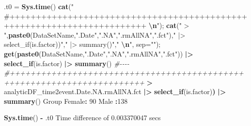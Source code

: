\documentclass[
]{article}
\newenvironment{Shaded}{\begin{snugshade}}{\end{snugshade}}
\newcommand{\AttributeTok}[1]{\textcolor[rgb]{0.13,0.29,0.53}{#1}}
\newcommand{\CommentTok}[1]{\textcolor[rgb]{0.56,0.35,0.01}{\textit{#1}}}
\newcommand{\DecValTok}[1]{\textcolor[rgb]{0.00,0.00,0.81}{#1}}
\newcommand{\ErrorTok}[1]{\textcolor[rgb]{0.64,0.00,0.00}{\textbf{#1}}}
\newcommand{\FloatTok}[1]{\textcolor[rgb]{0.00,0.00,0.81}{#1}}
\newcommand{\FunctionTok}[1]{\textcolor[rgb]{0.13,0.29,0.53}{\textbf{#1}}}
\newcommand{\NormalTok}[1]{#1}
\newcommand{\OtherTok}[1]{\textcolor[rgb]{0.56,0.35,0.01}{#1}}
\newcommand{\SpecialCharTok}[1]{\textcolor[rgb]{0.81,0.36,0.00}{\textbf{#1}}}
\newcommand{\StringTok}[1]{\textcolor[rgb]{0.31,0.60,0.02}{#1}}
\begin{document}
\begin{Shaded}
\begin{Highlighting}[]

\NormalTok{.t0 }\OtherTok{=} \FunctionTok{Sys.time}\NormalTok{()}
\FunctionTok{cat}\NormalTok{(}\StringTok{"   \#++++++++++++++++++++++++++++++++++++++++++++++++++++++++++++++++++++++++    }\SpecialCharTok{\textbackslash{}n}\StringTok{"}\NormalTok{); }\FunctionTok{cat}\NormalTok{(}\StringTok{" \textgreater{} "}\NormalTok{,}\FunctionTok{paste0}\NormalTok{(DataSetName,}\StringTok{".Date"}\NormalTok{,}\StringTok{".NA"}\NormalTok{,}\StringTok{".rmAllNA"}\NormalTok{,}\StringTok{".fct"}\NormalTok{),}\StringTok{" |\textgreater{} select\_if(is.factor))"}\NormalTok{,}\StringTok{" |\textgreater{} summary()"}\NormalTok{,}\StringTok{"  }\SpecialCharTok{\textbackslash{}n}\StringTok{"}\NormalTok{, }\AttributeTok{sep=}\StringTok{""}\NormalTok{); }\FunctionTok{get}\NormalTok{(}\FunctionTok{paste0}\NormalTok{(DataSetName,}\StringTok{".Date"}\NormalTok{,}\StringTok{".NA"}\NormalTok{,}\StringTok{".rmAllNA"}\NormalTok{,}\StringTok{".fct"}\NormalTok{)) }\SpecialCharTok{|\textgreater{}} \FunctionTok{select\_if}\NormalTok{(is.factor) }\SpecialCharTok{|\textgreater{}} \FunctionTok{summary}\NormalTok{() }\CommentTok{\#{-}{-}{-}{-}  }
   \CommentTok{\#++++++++++++++++++++++++++++++++++++++++++++++++++++++++++++++++++++++++    }
 \SpecialCharTok{\textgreater{}}\NormalTok{ analyticDF\_time2event.Date.NA.rmAllNA.fct }\SpecialCharTok{|\textgreater{}} \FunctionTok{select\_if}\NormalTok{(is.factor)}\ErrorTok{)} \SpecialCharTok{|\textgreater{}} \FunctionTok{summary}\NormalTok{()  }
\NormalTok{    Group    }
\NormalTok{ Female}\SpecialCharTok{:} \DecValTok{90}  
\NormalTok{ Male  }\SpecialCharTok{:}\DecValTok{138}  
\end{Highlighting}
\end{Shaded}

\begin{Shaded}
\begin{Highlighting}[]
\FunctionTok{Sys.time}\NormalTok{() }\SpecialCharTok{{-}}\NormalTok{ .t0}
\NormalTok{Time difference of }\FloatTok{0.003370047}\NormalTok{ secs}
\end{Highlighting}
\end{Shaded}
\end{document}
